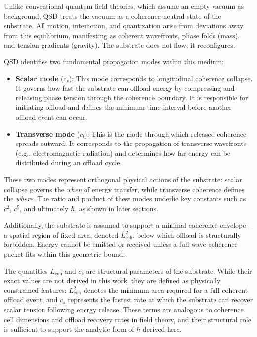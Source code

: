 \documentclass[ht-mathphys]{ht-fmt}
\theoremstyle{thmstyleone}%
\theoremstyle{thmstyletwo}%
\theoremstyle{thmstylethree}%
\begin{document}
Unlike conventional quantum field theories, which assume an empty vacuum as background, QSD treats the vacuum as a coherence-neutral state of the substrate. All motion, interaction, and quantization arise from deviations away from this equilibrium, manifesting as coherent wavefronts, phase folds (mass), and tension gradients (gravity). The substrate does not flow; it reconfigures.

QSD identifies two fundamental propagation modes within this medium:

\begin{itemize}
    \item \textbf{Scalar mode} ($c_s$): This mode corresponds to longitudinal coherence collapse. It governs how fast the substrate can offload energy by compressing and releasing phase tension through the coherence boundary. It is responsible for initiating offload and defines the minimum time interval before another offload event can occur.
    
    \item \textbf{Transverse mode} ($c_t$): This is the mode through which released coherence spreads outward. It corresponds to the propagation of transverse wavefronts (e.g., electromagnetic radiation) and determines how far energy can be distributed during an offload cycle.
\end{itemize}

These two modes represent orthogonal physical actions of the substrate: scalar collapse governs the \textit{when} of energy transfer, while transverse coherence defines the \textit{where}. The ratio and product of these modes underlie key constants such as $c^2$, $c^5$, and ultimately $\hbar$, as shown in later sections. 

Additionally, the substrate is assumed to support a minimal coherence envelope—a spatial region of fixed area, denoted $L_{\text{coh}}^2$, below which offload is structurally forbidden. Energy cannot be emitted or received unless a full-wave coherence packet fits within this geometric bound. 

The quantities $L_{\text{coh}}$ and $c_s$ are structural parameters of the substrate. While their exact values are not derived in this work, they are defined as physically constrained features: $L_{\text{coh}}^2$ denotes the minimum area required for a full coherent offload event, and $c_s$ represents the fastest rate at which the substrate can recover scalar tension following energy release. These terms are analogous to coherence cell dimensions and offload recovery rates in field theory, and their structural role is sufficient to support the analytic form of $\hbar$ derived here.
\end{document}
